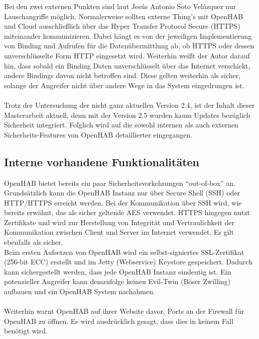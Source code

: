 Bei den zwei externen Punkten sind laut 
Jesús Antonio Soto Velázquez nur Lauschangriffe möglich. Normalerweise sollten externe Thing's mit OpenHAB und Cloud ausschließlich über das Hyper Transfer Protocol Secure (HTTPS) miteinander kommunizieren. Dabei hängt es von der jeweiligen Implementierung von Binding und Aufrufen für die Datenübermittlung ab, ob HTTPS oder dessen unverschlüsselte Form HTTP eingesetzt wird. Weiterhin weißt der Autor darauf hin, dass sobald ein Binding Daten unverschlüsselt über das Internet verschickt, andere Bindings davon nicht betroffen sind. Diese gelten weiterhin als sicher, solange der Angreifer nicht über andere Wege in das System eingedrungen ist.\\
\\
Trotz der Untersuchung der nicht ganz aktuellen Version 2.4, ist der Inhalt dieser Masterarbeit aktuell, denn mit der Version 2.5 wurden kaum Updates bezüglich Sicherheit integriert.\cite{OPENHAB02:OH} Folglich wird auf die sowohl internen als auch externen Sicherheits-Features von OpenHAB detaillierter eingegangen.

\subsection{Interne vorhandene Funktionalitäten}
OpenHAB bietet bereits ein paar Sicherheitsvorkehrungen "`out-of-box"' an. Grundsätzlich kann die OpenHAB Instanz nur über Secure Shell (SSH) oder HTTP/HTTPS erreicht werden. Bei der Kommunikation über SSH wird, wie bereits erwähnt, das als sicher geltende AES verwendet. HTTPS hingegen nutzt Zertifikate und wird zur Herstellung von Integrität und Vertraulichkeit der Kommunikation zwischen Client und Server im Internet verwendet. Es gilt ebenfalls als sicher.\\
Beim ersten Aufsetzen von OpenHAB wird ein selbst-signiertes SSL-Zertifikat (256-bit ECC) erstellt und im Jetty (Webservice) Keystore gespeichert. Dadurch kann sichergestellt werden, dass jede OpenHAB Instanz eindeutig ist. Ein potenzieller Angreifer kann demzufolge keinen Evil-Twin (Böser Zwilling) aufbauen und ein OpenHAB System nachahmen.\\
\\
Weiterhin warnt OpenHAB auf ihrer Website davor, Ports an der Firewall für OpenHAB zu öffnen. Es wird ausdrücklich gesagt, dass dies in keinem Fall benötigt wird.\cite{OPENHAB03:OH}

